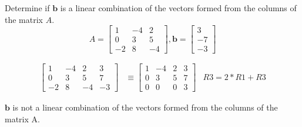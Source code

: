 \documentclass{../mathhomework}
\newcommand{\Vect}[1]{\pmb{#1}}
\begin{document}
\begin{problem}[1.3\#13]
    Determine if $\Vect{b}$ is a linear combination of the vectors formed from the columns of the matrix $A$.
    \begin{equation*}
        A = \begin{bmatrix}
            1 & -4 & 2 \\
            0 & 3 & 5 \\
            -2 & 8 & -4
        \end{bmatrix},
        \Vect{b} = \begin{bmatrix}
            3 \\ -7 \\ -3
        \end{bmatrix}
    \end{equation*}

    \begin{solution}
        \begin{align*}
            \begin{bmatrix}
                1 & -4 & 2 & 3 \\
                0 & 3 & 5 & 7 \\
                -2 & 8 & -4 & -3
            \end{bmatrix}
            & \equiv
            \begin{bmatrix}
                1 & -4 & 2 & 3 \\
                0 & 3 & 5 & 7 \\
                0 & 0 & 0 & 3
            \end{bmatrix}
            & R3 = 2 * R1 + R3
        \end{align*}

        $\Vect{b}$ is not a linear combination of the vectors formed from the columns of the matrix A.
    \end{solution}
\end{problem}
\end{document}
